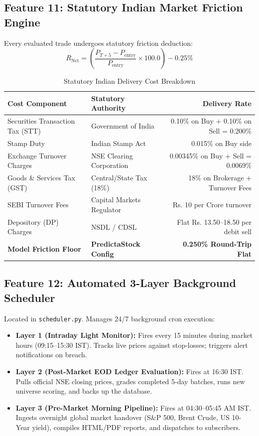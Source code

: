 \documentclass[11pt,a4paper]{article}
\begin{document}
\subsection{Feature 11: Statutory Indian Market Friction Engine}
Every evaluated trade undergoes statutory friction deduction:
\begin{equation}
R_{\text{Net}} = \left(\frac{P_{T+5} - P_{\text{entry}}}{P_{\text{entry}}} \times 100.0\right) - 0.25\%
\end{equation}
\begin{table}[h!]
\centering
\small
\begin{tabular}{llr}
\toprule
\textbf{Cost Component} & \textbf{Statutory Authority} & \textbf{Delivery Rate} \\
\midrule
Securities Transaction Tax (STT) & Government of India & 0.10\% on Buy + 0.10\% on Sell = 0.200\% \\
Stamp Duty & Indian Stamp Act & 0.015\% on Buy side \\
Exchange Turnover Charges & NSE Clearing Corporation & 0.00345\% on Buy + Sell = 0.0069\% \\
Goods \& Services Tax (GST) & Central/State Tax (18\%) & 18\% on Brokerage + Turnover Fees \\
SEBI Turnover Fees & Capital Markets Regulator & Rs. 10 per Crore turnover \\
Depository (DP) Charges & NSDL / CDSL & Flat Rs. 13.50--18.50 per debit sell \\
\midrule
\textbf{Model Friction Floor} & \textbf{PredictaStock Config} & \textbf{0.250\% Round-Trip Flat} \\
\bottomrule
\end{tabular}
\caption{Statutory Indian Delivery Cost Breakdown}
\end{table}

\subsection{Feature 12: Automated 3-Layer Background Scheduler}
Located in \texttt{scheduler.py}. Manages 24/7 background cron execution:
\begin{itemize}[leftmargin=*]
    \item \textbf{Layer 1 (Intraday Light Monitor):} Fires every 15 minutes during market hours (09:15--15:30 IST). Tracks live prices against stop-losses; triggers alert notifications on breach.
    \item \textbf{Layer 2 (Post-Market EOD Ledger Evaluation):} Fires at 16:30 IST. Pulls official NSE closing prices, grades completed 5-day batches, runs new universe scoring, and backs up the database.
    \item \textbf{Layer 3 (Pre-Market Morning Pipeline):} Fires at 04:30--05:45 AM IST. Ingests overnight global market handover (S\&P 500, Brent Crude, US 10-Year yield), compiles HTML/PDF reports, and dispatches to subscribers.
\end{itemize}
\end{document}

